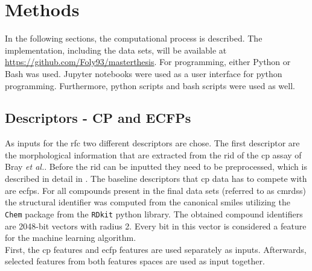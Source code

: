 \chapter{Methods}\label{sec:methods}
In the following sections, the computational process is described. The implementation, including the data sets, will be available at \url{https://github.com/Foly93/masterthesis}. For programming, either Python or Bash was used. Jupyter notebooks were used as a user interface for python programming. Furthermore, python scripts and bash scripts were used as well.
%
%
\section{Descriptors - CP and ECFPs}\label{sec:ecfppubchem}
As inputs for the \ac{rfc} two different descriptors are chose. The first descriptor are the morphological information that are extracted from the \acl{rid} of the \ac{cp} assay of Bray \textit{et al.}\cite{Bray2017}. Before the \acl{rid} can be inputted they need to be preprocessed, which is described in detail in . The baseline descriptors that \ac{cp} data has to compete with are \acp{ecfp}. For all compounds present in the final data sets (referred to as \aclp{cmrds}) the structural identifier was computed from the canonical \ac{smiles} utilizing the \texttt{Chem} package from the \texttt{RDkit} python library.\cite{Landrum2019} The obtained compound identifiers are \num{2048}-bit vectors with radius \num{2}. Every bit in this vector is considered a feature for the machine learning algorithm.\cite{Landrum2019}\\
First, the \ac{cp} features and \ac{ecfp} features are used separately as inputs. Afterwards, selected features from both features spaces are used as input together.
%
%

